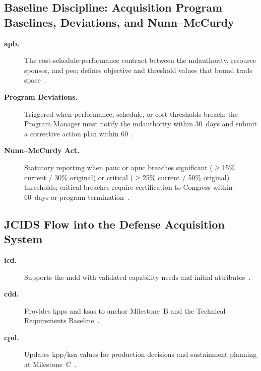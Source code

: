 \documentclass[../main.tex]{subfiles}
\begin{document}
\subsection{Baseline Discipline: Acquisition Program Baselines, Deviations, and Nunn--McCurdy}
\begin{description}
  \item[\textbf{\ac{apb}.}] The cost-schedule-performance contract between the \ac{mdauthority}, resource sponsor, and \ac{peo}; defines objective and threshold values that bound trade space~\autocite{DoDI5000-85}.
  \item[\textbf{Program Deviations.}] Triggered when performance, schedule, or cost thresholds breach; the Program Manager must notify the \ac{mdauthority} within 30~days and submit a corrective action plan within 60~\autocite{DoDI5000-85}.
  \item[\textbf{Nunn--McCurdy Act.}] Statutory reporting when \ac{pauc} or \ac{apuc} breaches significant ($\geq$15\% current / 30\% original) or critical ($\geq$25\% current / 50\% original) thresholds; critical breaches require certification to Congress within 60~days or program termination~\autocite{USC-4371-NunnMcCurdy}.
\end{description}

\subsection{JCIDS Flow into the Defense Acquisition System}
\begin{description}
  \item[\textbf{\ac{icd}.}] Supports the \ac{mdd} with validated capability needs and initial attributes~\autocite{CJCSI5123-01H}.
  \item[\textbf{\ac{cdd}.}] Provides \acp{kpp} and \acp{ksa} to anchor Milestone~B and the Technical Requirements Baseline~\autocite{CJCSI5123-01H}.
  \item[\textbf{\ac{cpd}.}] Updates \ac{kpp}/\ac{ksa} values for production decisions and sustainment planning at Milestone~C~\autocite{CJCSI5123-01H}.
\end{description}
\end{document}

